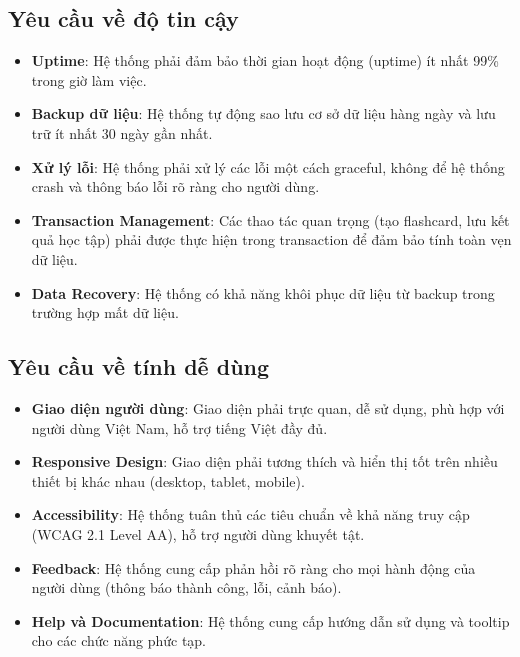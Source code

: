 \documentclass[../DoAn.tex]{subfiles}
\begin{document}
\subsection{Yêu cầu về độ tin cậy}
\begin{itemize}
    \item \textbf{Uptime}: Hệ thống phải đảm bảo thời gian hoạt động (uptime) ít nhất 99\% trong giờ làm việc.
    \item \textbf{Backup dữ liệu}: Hệ thống tự động sao lưu cơ sở dữ liệu hàng ngày và lưu trữ ít nhất 30 ngày gần nhất.
    \item \textbf{Xử lý lỗi}: Hệ thống phải xử lý các lỗi một cách graceful, không để hệ thống crash và thông báo lỗi rõ ràng cho người dùng.
    \item \textbf{Transaction Management}: Các thao tác quan trọng (tạo flashcard, lưu kết quả học tập) phải được thực hiện trong transaction để đảm bảo tính toàn vẹn dữ liệu.
    \item \textbf{Data Recovery}: Hệ thống có khả năng khôi phục dữ liệu từ backup trong trường hợp mất dữ liệu.
\end{itemize}

\subsection{Yêu cầu về tính dễ dùng}
\begin{itemize}
    \item \textbf{Giao diện người dùng}: Giao diện phải trực quan, dễ sử dụng, phù hợp với người dùng Việt Nam, hỗ trợ tiếng Việt đầy đủ.
    \item \textbf{Responsive Design}: Giao diện phải tương thích và hiển thị tốt trên nhiều thiết bị khác nhau (desktop, tablet, mobile).
    \item \textbf{Accessibility}: Hệ thống tuân thủ các tiêu chuẩn về khả năng truy cập (WCAG 2.1 Level AA), hỗ trợ người dùng khuyết tật.
    \item \textbf{Feedback}: Hệ thống cung cấp phản hồi rõ ràng cho mọi hành động của người dùng (thông báo thành công, lỗi, cảnh báo).
    \item \textbf{Help và Documentation}: Hệ thống cung cấp hướng dẫn sử dụng và tooltip cho các chức năng phức tạp.
\end{itemize}
\end{document}
